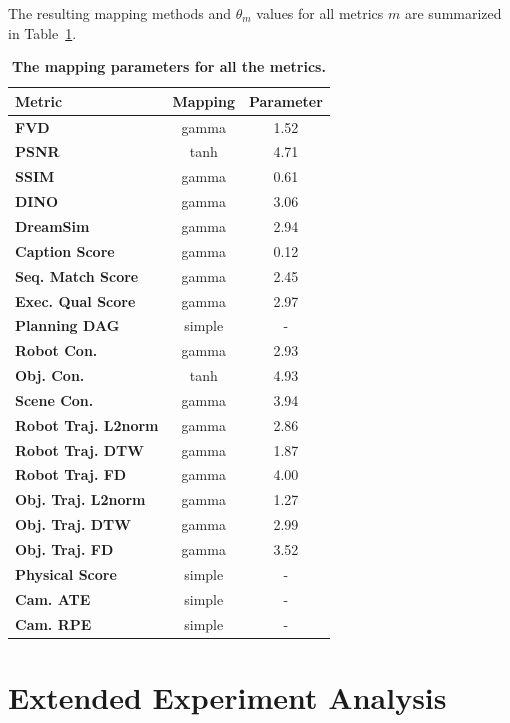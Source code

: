 The resulting mapping methods and $\theta_m$ values for all metrics $m$ are summarized in Table~\ref{tab:gamma-param}.
\begin{table}[!h]
\centering
\caption{\textbf{The mapping parameters for all the metrics.}}
\label{tab:gamma-param}
\begin{tabular}{lcc}
\toprule
\textbf{Metric} & \textbf{Mapping} & \textbf{Parameter} \\
\midrule
\textbf{FVD} & gamma & 1.52 \\
\textbf{PSNR} & tanh & 4.71 \\
\textbf{SSIM} & gamma & 0.61 \\
\textbf{DINO} & gamma & 3.06 \\
\textbf{DreamSim} & gamma & 2.94 \\
\textbf{Caption Score} & gamma & 0.12 \\
\textbf{Seq. Match Score} & gamma & 2.45 \\
\textbf{Exec. Qual Score} & gamma & 2.97 \\
\textbf{Planning DAG} & simple & - \\
\textbf{Robot Con.} & gamma & 2.93 \\
\textbf{Obj. Con.} & tanh & 4.93 \\
\textbf{Scene Con.} & gamma & 3.94 \\
\textbf{Robot Traj. L2norm} & gamma & 2.86 \\
\textbf{Robot Traj. DTW} & gamma & 1.87 \\
\textbf{Robot Traj. FD} & gamma & 4.00 \\
\textbf{Obj. Traj. L2norm} & gamma & 1.27 \\
\textbf{Obj. Traj. DTW} & gamma & 2.99 \\
\textbf{Obj. Traj. FD} & gamma & 3.52 \\
\textbf{Physical Score} & simple & - \\
\textbf{Cam. ATE} & simple & - \\
\textbf{Cam. RPE} & simple & - \\

\bottomrule
\end{tabular}
\end{table}

\section{Extended Experiment Analysis}
